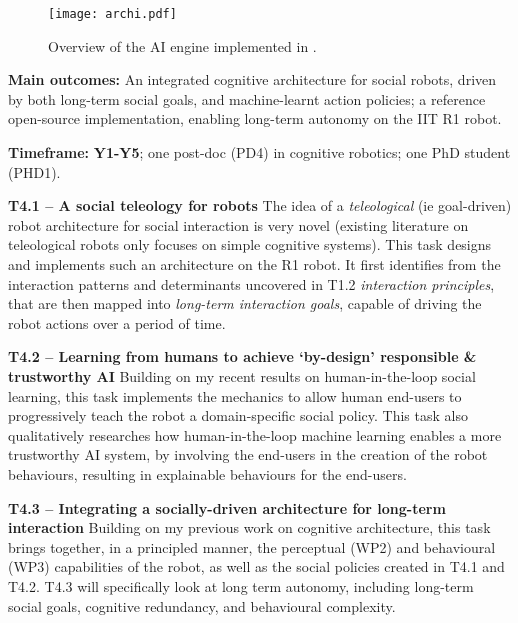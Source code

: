 \begin{figure}[h!]
\centering
\texttt{[image: archi.pdf]}
\caption{Overview of the AI engine implemented in \project.}
\label{fig:archi}
\end{figure}


\begin{oframed}
    \textbf{Main outcomes:} An integrated cognitive architecture for social
    robots, driven by both long-term social goals, and machine-learnt action
    policies; a reference open-source implementation, enabling long-term
    autonomy on the IIT R1 robot.

    \textbf{Timeframe:} \textbf{Y1-Y5}; one post-doc (PD4) in cognitive
    robotics; one PhD student (PHD1).

\end{oframed}

\textbf{T4.1 -- A social teleology for robots} The idea of a \emph{teleological}
(ie goal-driven) robot architecture for social interaction is very novel
(existing literature on teleological robots only focuses on simple cognitive
systems). This task designs
and implements such an architecture on the R1 robot. It first identifies from
the interaction patterns and determinants uncovered in T1.2 \emph{interaction
principles}, that are then mapped into \emph{long-term interaction goals}, capable of
driving the robot actions over a period of time.

\textbf{T4.2 -- Learning from humans to achieve `by-design' responsible \&
trustworthy AI} Building on my recent results on human-in-the-loop social
learning, this task
implements the mechanics to allow human end-users to progressively teach the
robot a domain-specific social policy.  This task also qualitatively researches
how human-in-the-loop machine learning enables a more trustworthy AI system, by
involving the end-users in the creation of the robot behaviours, resulting in
explainable behaviours for the end-users.

\textbf{T4.3 -- Integrating a socially-driven architecture for long-term
interaction} Building on my previous work on cognitive
architecture, this task brings together, in a
principled manner, the perceptual (WP2) and behavioural
(WP3) capabilities of the robot, as well as the social policies created in T4.1 and
T4.2. T4.3 will specifically look at long term autonomy, including long-term
social goals, cognitive redundancy, and behavioural complexity.

